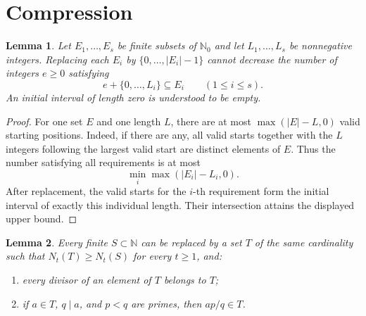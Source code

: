 \documentclass[11pt,a4paper]{article}
\newtheorem{lemma}{Lemma}
\newcommand{\N}{\mathbb N}
\newcommand{\Nzero}{\mathbb N_0}
\begin{document}
\section{Compression}

\begin{lemma}\label{lem:intervals}
Let $E_1,\ldots,E_s$ be finite subsets of $\Nzero$ and let $L_1,\ldots,L_s$ be nonnegative integers.
Replacing each $E_i$ by $\{0,\ldots,|E_i|-1\}$ cannot decrease the number of integers $e\ge0$ satisfying
\[
e+\{0,\ldots,L_i\}\subseteq E_i\qquad(1\le i\le s).
\]
An initial interval of length zero is understood to be empty.
\end{lemma}

\begin{proof}
For one set $E$ and one length $L$, there are at most $\max(|E|-L,0)$ valid starting positions.
Indeed, if there are any, all valid starts together with the $L$ integers following the largest valid start are distinct elements of $E$.
Thus the number satisfying all requirements is at most
\[
\min_i\max(|E_i|-L_i,0).
\]
After replacement, the valid starts for the $i$-th requirement form the initial interval of exactly this individual length.
Their intersection attains the displayed upper bound.
\end{proof}

\newpage
\begin{lemma}\label{lem:compression}
Every finite $S\subset\N$ can be replaced by a set $T$ of the same cardinality such that $N_t(T)\ge N_t(S)$ for every $t\ge1$, and:
\begin{enumerate}[label=(\roman*)]
\item every divisor of an element of $T$ belongs to $T$;
\item if $a\in T$, $q\mid a$, and $p<q$ are primes, then $ap/q\in T$.
\end{enumerate}
\end{lemma}
\end{document}
